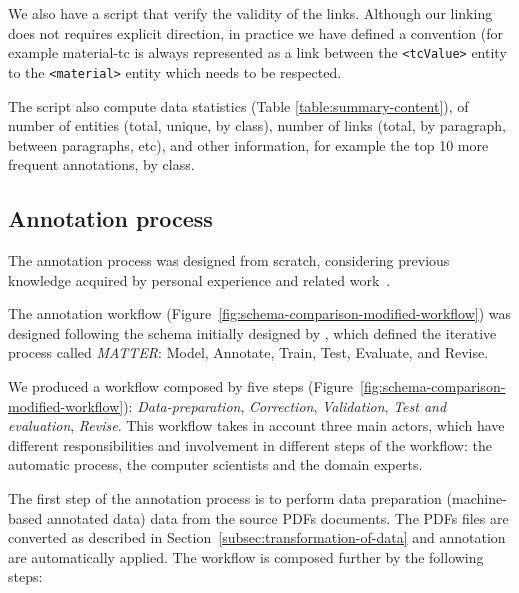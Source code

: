 \documentclass[fleqn,10pt]{wlscirep}
\begin{document}
We also have a script that verify the validity of the links. Although our linking does not requires explicit direction, in practice we have defined a convention (for example material-tc is always represented as a link between the \texttt{<tcValue>} entity to the \texttt{<material>} entity which needs to be respected. 

The script also compute data statistics (Table \ref{table:summary-content}), of number of entities (total, unique, by class), number of links (total, by paragraph, between paragraphs, etc), and other information, for example the top 10 more frequent annotations, by class. 

\FloatBarrier
\subsection*{Annotation process}
\label{subsec:annotation-workflow}
The annotation process was designed from scratch, considering previous  knowledge acquired by personal experience and related work~\cite{Dieb2016, Krallinger2015TheCC}. 

The annotation workflow (Figure~\ref{fig:schema-comparison-modified-workflow}) was designed following the schema initially designed by \cite{pustejovsky2012natural}, which defined the iterative process called \textit{MATTER}: Model, Annotate, Train, Test, Evaluate, and Revise.

We produced a workflow composed by five steps (Figure~\ref{fig:schema-comparison-modified-workflow}): \textit{Data-preparation}, \textit{Correction}, \textit{Validation}, \textit{Test and evaluation}, \textit{Revise}. 
This workflow takes in account three main actors, which have different responsibilities and involvement in different steps of the workflow: the automatic process, the computer scientists and the domain experts.

The first step of the annotation process is to perform data preparation (machine-based annotated data) data from the source PDFs documents. 
The PDFs files are converted as described in Section~\ref{subsec:transformation-of-data} and annotation are automatically applied. 
The workflow is composed further by the following steps: 
\end{document}
